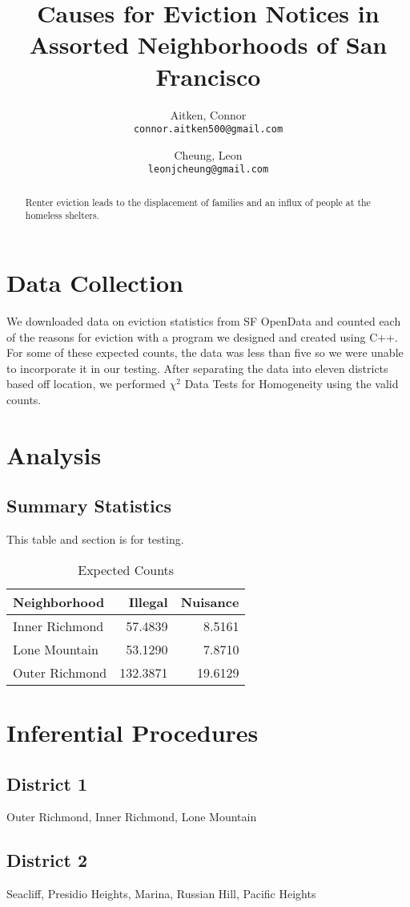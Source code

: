 \documentclass[]{article}
\title{Causes for Eviction Notices in Assorted Neighborhoods of San Francisco}
\author{
Aitken, Connor\\
\texttt{connor.aitken500@gmail.com}
\and
Cheung, Leon\\
\texttt{leonjcheung@gmail.com}
}
\begin{document}
\maketitle

\begin{abstract}
Renter eviction leads to the displacement of families and an influx of people at the homeless shelters.  
\end{abstract}

\section{Data Collection}
We downloaded data on eviction statistics from SF OpenData and counted each of the reasons for eviction with a program we designed and created using C++. For some of these expected counts, the data was less than five so we were unable to incorporate it in our testing. After separating the data into eleven districts based off location, we performed $\chi ^{2}$ Data Tests for Homogeneity using the valid counts.
\section{Analysis}
\subsection{Summary Statistics}
This table and section is for testing.
\begin{table}[h]
\caption{Expected Counts}
\centering
\begin{tabular}{l r r}
Neighborhood   & Illegal  & Nuisance \\ \hline
Inner Richmond & 57.4839  & 8.5161   \\
Lone Mountain  & 53.1290  & 7.8710   \\ 
Outer Richmond & 132.3871 & 19.6129  \\ 
\end{tabular}
\end{table}
\section{Inferential Procedures}
\subsection{District 1}
Outer Richmond, Inner Richmond, Lone Mountain
\subsection{District 2}
Seacliff, Presidio Heights, Marina, Russian Hill, Pacific Heights
\end{document}
